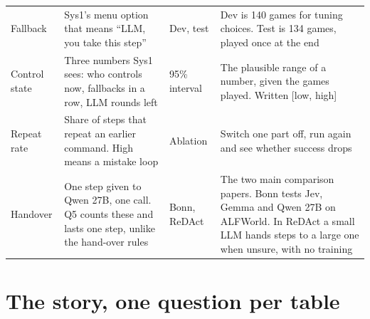 \documentclass[10pt]{article}
\begin{document}
\begin{table}[H]
\begin{tabularx}{\linewidth}{@{}P{2.5cm} L P{2.5cm} L@{}}
\cmidrule(l){3-4}
Fallback & Sys1's menu option that means ``LLM, you take this step'' & Dev, test & Dev is 140 games for tuning choices. Test is 134 games, played once at the end \\
Control state & Three numbers Sys1 sees: who controls now, fallbacks in a row, LLM rounds left & 95\% interval & The plausible range of a number, given the games played. Written [low, high] \\
Repeat rate & Share of steps that repeat an earlier command. High means a mistake loop & Ablation & Switch one part off, run again and see whether success drops \\
Handover & One step given to Qwen 27B, one call. Q5 counts these and lasts one step, unlike the hand-over rules & Bonn, ReDAct & The two main comparison papers. Bonn tests Jev, Gemma and Qwen 27B on ALFWorld. In ReDAct a small LLM hands steps to a large one when unsure, with no training \\
\bottomrule
\end{tabularx}
\end{table}

\section{The story, one question per table}
\end{document}
